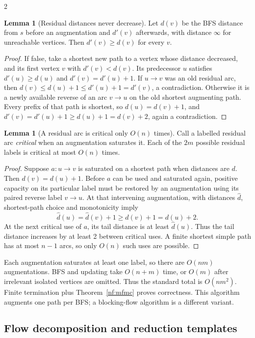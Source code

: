 \documentclass[10pt]{article}
\theoremstyle{definition}
\newtheorem{lemma}[definition]{Lemma}
\begin{document}
\begin{multicols*}{2}
\begin{lemma}[Residual distances never decrease]\label{nf:distance}
Let $d(v)$ be the BFS distance from $s$ before an augmentation and $d'(v)$
afterwards, with distance $\infty$ for unreachable vertices. Then
$d'(v)\ge d(v)$ for every $v$.
\end{lemma}
\begin{proof}
If false, take a shortest new path to a vertex whose distance decreased,
and its first vertex $v$ with $d'(v)<d(v)$. Its predecessor $u$ satisfies
$d'(u)\ge d(u)$ and $d'(v)=d'(u)+1$. If $u\to v$ was an old residual arc,
then $d(v)\le d(u)+1\le d'(u)+1=d'(v)$, a contradiction.
Otherwise it is a newly available reverse of an arc $v\to u$ on the old
shortest augmenting path. Every prefix of that path is shortest, so
$d(u)=d(v)+1$, and
$d'(v)=d'(u)+1\ge d(u)+1=d(v)+2$, again a contradiction.
\end{proof}

\begin{lemma}[A residual arc is critical only $O(n)$ times]\label{nf:critical}
Call a labelled residual arc \emph{critical} when an augmentation saturates
it. Each of the $2m$ possible residual labels is critical at most $O(n)$ times.
\end{lemma}
\begin{proof}
Suppose $a:u\to v$ is saturated on a shortest path when distances are $d$.
Then $d(v)=d(u)+1$. Before $a$ can be used and saturated again, positive
capacity on its particular label must be restored by an augmentation using
its paired reverse label $v\to u$. At that intervening augmentation, with
distances $\widehat d$, shortest-path choice and monotonicity imply
\[
 \widehat d(u)=\widehat d(v)+1\ge d(v)+1=d(u)+2.
\]
At the next critical use of $a$, its tail distance is at least
$\widehat d(u)$. Thus the tail distance increases by at least 2 between
critical uses. A finite shortest simple path has at most $n-1$ arcs, so only
$O(n)$ such uses are possible.
\end{proof}
Each augmentation saturates at least one label, so there are $O(nm)$
augmentations. BFS and updating take $O(n+m)$ time, or $O(m)$ after irrelevant
isolated vertices are omitted. Thus the standard total is $O(nm^2)$.
Finite termination plus Theorem~\ref{nf:mfmc} proves correctness.
This algorithm augments one path per BFS; a blocking-flow algorithm is a
different variant.

\subsection{Flow decomposition and reduction templates}\label{nf:reductions}

\end{multicols*}
\end{document}
